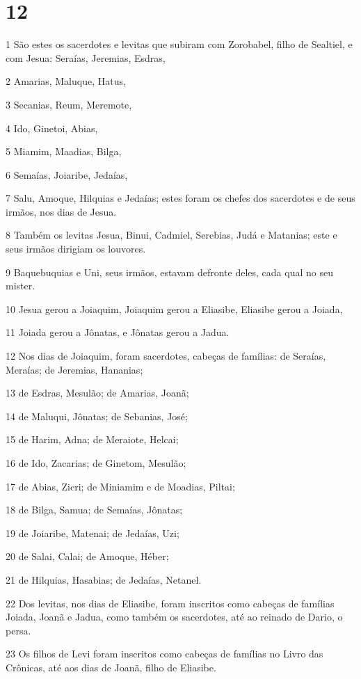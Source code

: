 \chapter{12}

\par 1 São estes os sacerdotes e levitas que subiram com Zorobabel, filho de Sealtiel, e com Jesua: Seraías, Jeremias, Esdras,
\par 2 Amarias, Maluque, Hatus,
\par 3 Secanias, Reum, Meremote,
\par 4 Ido, Ginetoi, Abias,
\par 5 Miamim, Maadias, Bilga,
\par 6 Semaías, Joiaribe, Jedaías,
\par 7 Salu, Amoque, Hilquias e Jedaías; estes foram os chefes dos sacerdotes e de seus irmãos, nos dias de Jesua.
\par 8 Também os levitas Jesua, Binui, Cadmiel, Serebias, Judá e Matanias; este e seus irmãos dirigiam os louvores.
\par 9 Baquebuquias e Uni, seus irmãos, estavam defronte deles, cada qual no seu mister.
\par 10 Jesua gerou a Joiaquim, Joiaquim gerou a Eliasibe, Eliasibe gerou a Joiada,
\par 11 Joiada gerou a Jônatas, e Jônatas gerou a Jadua.
\par 12 Nos dias de Joiaquim, foram sacerdotes, cabeças de famílias: de Seraías, Meraías; de Jeremias, Hananias;
\par 13 de Esdras, Mesulão; de Amarias, Joanã;
\par 14 de Maluqui, Jônatas; de Sebanias, José;
\par 15 de Harim, Adna; de Meraiote, Helcai;
\par 16 de Ido, Zacarias; de Ginetom, Mesulão;
\par 17 de Abias, Zicri; de Miniamim e de Moadias, Piltai;
\par 18 de Bilga, Samua; de Semaías, Jônatas;
\par 19 de Joiaribe, Matenai; de Jedaías, Uzi;
\par 20 de Salai, Calai; de Amoque, Héber;
\par 21 de Hilquias, Hasabias; de Jedaías, Netanel.
\par 22 Dos levitas, nos dias de Eliasibe, foram inscritos como cabeças de famílias Joiada, Joanã e Jadua, como também os sacerdotes, até ao reinado de Dario, o persa.
\par 23 Os filhos de Levi foram inscritos como cabeças de famílias no Livro das Crônicas, até aos dias de Joanã, filho de Eliasibe.
